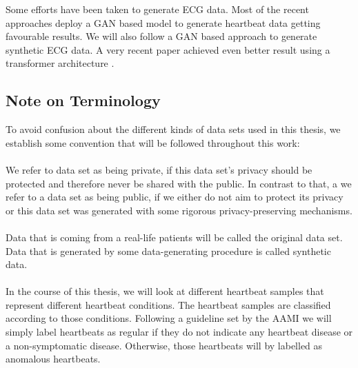 Some efforts have been taken to generate ECG data. Most of the recent approaches deploy a GAN based model to generate heartbeat data \Parencite[see e. g.][]{zhu2019electrocardiogram,Delaney2019SynthesisOR,wang2020accurate} getting favourable results. We will also follow a GAN based approach to generate synthetic ECG data. A very recent paper achieved even better result using a transformer architecture \Parencite[see][]{Kaleli2023GenerationOS}.  

\subsection{Note on Terminology}
To avoid confusion about the different kinds of data sets used in this thesis, we establish some convention that will be followed throughout this work:

\paragraph{}
We refer to data set as being private, if this data set's privacy should be protected and therefore never be shared with the public. In contrast to that, a we refer to a data set as being public, if we either do not aim to protect its privacy or this data set was generated with some rigorous privacy-preserving mechanisms.

\paragraph{}
Data that is coming from a real-life patients will be called the original data set. Data that is generated by some data-generating procedure is called synthetic data.

\paragraph{}
In the course of this thesis, we will look at different heartbeat samples that represent different heartbeat conditions. The heartbeat samples are classified according to those conditions. Following a guideline set by the AAMI we will simply label heartbeats as regular if they do not indicate any heartbeat disease or a non-symptomatic disease. Otherwise, those heartbeats will by labelled as anomalous heartbeats.